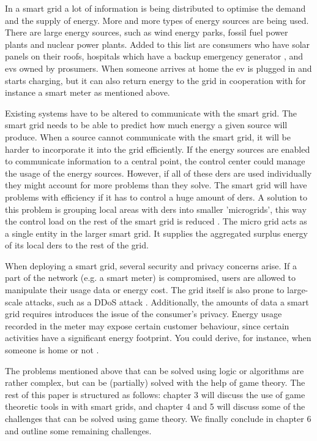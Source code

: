 In a smart grid a lot of information is being distributed to optimise the demand and the supply of energy. More and more types of energy sources are being used. There are large energy sources, such as wind energy parks, fossil fuel power plants and nuclear power plants. Added to this list are consumers who have solar panels on their roofs, hospitals which have a backup emergency generator \cite{Kumagai2012}, and \acp{ev} owned by prosumers. When someone arrives at home the \ac{ev} is plugged in and starts charging, but it can also return energy to the grid in cooperation with for instance a smart meter as mentioned above.

Existing systems have to be altered to communicate with the smart grid. The smart grid needs to be able to predict how much energy a given source will produce. When a source cannot communicate with the smart grid, it will be harder to incorporate it into the grid efficiently. If the energy sources are enabled to communicate information to a central point, the control center could manage the usage of the energy sources. However, if all of these \acp{der} are used individually they might account for more problems than they solve. The smart grid will have problems with efficiency if it has to control a huge amount of \acp{der}. A solution to this problem is grouping local areas with \acp{der} into smaller 'microgrids', this way the control load on the rest of the smart grid is reduced \cite{HatziargyriouAsanoIravaniMarnay2007}. The micro grid acts as a single entity in the larger smart grid. It supplies the aggregated surplus energy of its local \acp{der} to the rest of the grid. 

When deploying a smart grid, several security and privacy concerns arise.  If a part of the network (e.g. a smart meter) is compromised, users are allowed to manipulate their usage data or energy cost. The grid itself is also prone to large-scale attacks, such as a DDoS attack \cite{McDanielMcLaughlin2009a}. Additionally, the amounts of data a smart grid requires introduces the issue of the consumer's privacy. Energy usage recorded in the meter may expose certain customer behaviour, since certain activities have a significant energy footprint. You could derive, for instance, when someone is home or not \cite{Molina-MarkhamShenoyFuEtAl2010}.

The problems mentioned above that can be solved using logic or algorithms are rather complex, but can be (partially) solved with the help of game theory. The rest of this paper is structured as follows: chapter 3 will discuss the use of game theoretic tools in with smart grids, and chapter 4 and 5 will discuss some of the challenges that can be solved using game theory. We finally conclude in chapter 6 and outline some remaining challenges.
